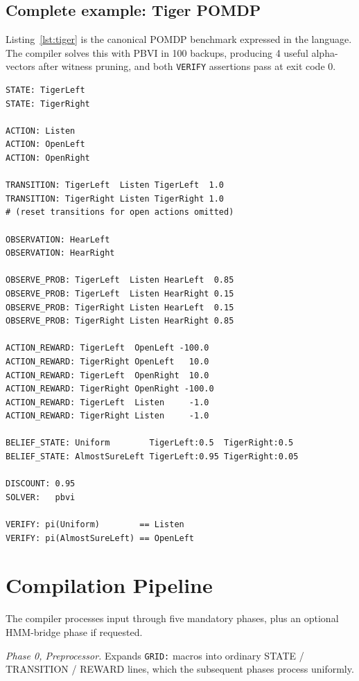 \documentclass[conference]{IEEEtran}
\begin{document}
\subsection{Complete example: Tiger POMDP}

Listing~\ref{lst:tiger} is the canonical POMDP benchmark expressed
in the language. The compiler solves this with PBVI in 100 backups,
producing 4 useful alpha-vectors after witness pruning, and both
\texttt{VERIFY} assertions pass at exit code 0.

\begin{lstlisting}[style=dsl,caption={Tiger POMDP in MDP-DSL.},label={lst:tiger}]
STATE: TigerLeft
STATE: TigerRight

ACTION: Listen
ACTION: OpenLeft
ACTION: OpenRight

TRANSITION: TigerLeft  Listen TigerLeft  1.0
TRANSITION: TigerRight Listen TigerRight 1.0
# (reset transitions for open actions omitted)

OBSERVATION: HearLeft
OBSERVATION: HearRight

OBSERVE_PROB: TigerLeft  Listen HearLeft  0.85
OBSERVE_PROB: TigerLeft  Listen HearRight 0.15
OBSERVE_PROB: TigerRight Listen HearLeft  0.15
OBSERVE_PROB: TigerRight Listen HearRight 0.85

ACTION_REWARD: TigerLeft  OpenLeft -100.0
ACTION_REWARD: TigerRight OpenLeft   10.0
ACTION_REWARD: TigerLeft  OpenRight  10.0
ACTION_REWARD: TigerRight OpenRight -100.0
ACTION_REWARD: TigerLeft  Listen     -1.0
ACTION_REWARD: TigerRight Listen     -1.0

BELIEF_STATE: Uniform        TigerLeft:0.5  TigerRight:0.5
BELIEF_STATE: AlmostSureLeft TigerLeft:0.95 TigerRight:0.05

DISCOUNT: 0.95
SOLVER:   pbvi

VERIFY: pi(Uniform)        == Listen
VERIFY: pi(AlmostSureLeft) == OpenLeft
\end{lstlisting}

\section{Compilation Pipeline}

The compiler processes input through five mandatory phases, plus an
optional HMM-bridge phase if requested.

\emph{Phase 0, Preprocessor.} Expands \texttt{GRID:} macros into
ordinary STATE / TRANSITION / REWARD lines, which the subsequent
phases process uniformly.
\end{document}
